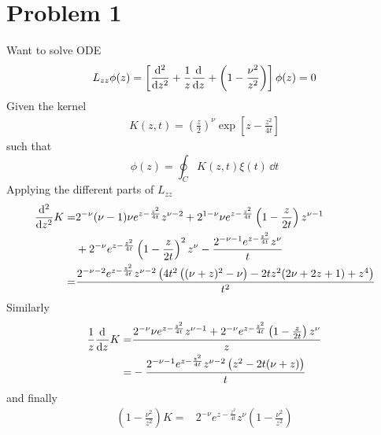 \documentclass[a4paper,12pt]{article}
\begin{document}
\section*{Problem 1}
Want to solve ODE
\begin{equation}
	\begin{aligned}
		L_{zz}\phi(z)=\left[\dv[2]{}{z}+\frac{1}{z}\dv{}{z}+\left(1-\frac{\nu^2}{z^2}\right)\right]\phi(z)=0
	\end{aligned}
\end{equation}
Given the kernel
\begin{equation}
	\begin{aligned}
		K(z,t)=\left(\frac{z}{2}\right)^\nu\exp[z-\frac{z^2}{4t}]
	\end{aligned}
\end{equation}
such that
\begin{equation}
\phi(z)=\oint_{C} K(z,t)\xi(t)\, \dd t
\end{equation}
Applying the different parts of $L_{zz}$
\begin{equation}
	\begin{aligned}
		\dv[2]{}{z}K=&2^{-\nu } (\nu -1) \nu  e^{z-\frac{z^2}{4 t}} z^{\nu -2}+2^{1-\nu } \nu  e^{z-\frac{z^2}{4 t}} \left(1-\frac{z}{2 t}\right) z^{\nu -1}\\
		&+2^{-\nu } e^{z-\frac{z^2}{4 t}} \left(1-\frac{z}{2 t}\right)^2 z^{\nu }-\frac{2^{-\nu -1} e^{z-\frac{z^2}{4 t}} z^{\nu }}{t}\\
		=&\frac{2^{-\nu -2} e^{z-\frac{z^2}{4 t}} z^{\nu -2} \left(4 t^2 \left((\nu +z)^2-\nu \right)-2 t z^2 (2 \nu +2 z+1)+z^4\right)}{t^2}
	\end{aligned}
\end{equation}
Similarly
\begin{equation}
	\begin{aligned}
		\frac{1}{z}\dv[]{}{z}K=&\frac{2^{-\nu } \nu  e^{z-\frac{z^2}{4 t}} z^{\nu -1}+2^{-\nu } e^{z-\frac{z^2}{4 t}} \left(1-\frac{z}{2 t}\right) z^{\nu }}{z}\\
		=&-\frac{2^{-\nu -1} e^{z-\frac{z^2}{4 t}} z^{\nu -2} \left(z^2-2 t (\nu +z)\right)}{t}
	\end{aligned}
\end{equation}
and finally 
\begin{equation}
	\begin{aligned}
		\left(1-\frac{\nu^2}{z^2}\right)K=&2^{-\nu } e^{z-\frac{z^2}{4 t}} z^{\nu } \left(1-\frac{\nu ^2}{z^2}\right)
	\end{aligned}
\end{equation}
\end{document}
